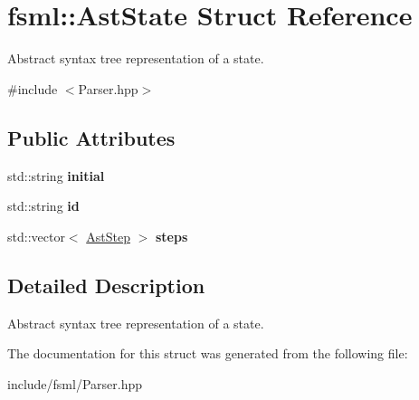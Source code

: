 \hypertarget{structfsml_1_1AstState}{\section{fsml\-:\-:Ast\-State Struct Reference}
\label{structfsml_1_1AstState}
}


Abstract syntax tree representation of a state.  




{\ttfamily \#include $<$Parser.\-hpp$>$}

\subsection*{Public Attributes}
\begin{DoxyCompactItemize}
\item 
\hypertarget{structfsml_1_1AstState_a89a44c91811564d41c48343cf34560cd}{std\-::string {\bfseries initial}}\label{structfsml_1_1AstState_a89a44c91811564d41c48343cf34560cd}

\item 
\hypertarget{structfsml_1_1AstState_a3e7e96d12d2e17d8d35d313b232cb4f5}{std\-::string {\bfseries id}}\label{structfsml_1_1AstState_a3e7e96d12d2e17d8d35d313b232cb4f5}

\item 
\hypertarget{structfsml_1_1AstState_a39a00b99d02537f2b014556c203d9c36}{std\-::vector$<$ \hyperlink{structfsml_1_1AstStep}{Ast\-Step} $>$ {\bfseries steps}}\label{structfsml_1_1AstState_a39a00b99d02537f2b014556c203d9c36}

\end{DoxyCompactItemize}


\subsection{Detailed Description}
Abstract syntax tree representation of a state. 



The documentation for this struct was generated from the following file\-:\begin{DoxyCompactItemize}
\item 
include/fsml/Parser.\-hpp\end{DoxyCompactItemize}
